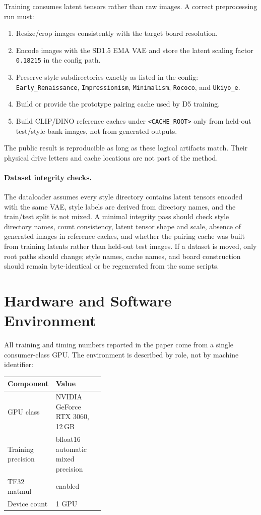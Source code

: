 \documentclass[10pt,twocolumn]{article}
\begin{document}
Training consumes latent tensors rather than raw images. A correct preprocessing run must:
\begin{enumerate}[leftmargin=1.6em,itemsep=0.2em]
  \item Resize/crop images consistently with the target board resolution.
  \item Encode images with the SD1.5 EMA VAE and store the latent scaling factor
  \texttt{0.18215} in the config path.
  \item Preserve style subdirectories exactly as listed in the config:
  \texttt{Early\_Renaissance}, \texttt{Impressionism}, \texttt{Minimalism},
  \texttt{Rococo}, and \texttt{Ukiyo\_e}.
  \item Build or provide the prototype pairing cache used by D5 training.
  \item Build CLIP/DINO reference caches under \texttt{<CACHE\_ROOT>} only from held-out
  test/style-bank images, not from generated outputs.
\end{enumerate}

The public result is reproducible as long as these logical artifacts match. Their
physical drive letters and cache locations are not part of the method.

\paragraph{Dataset integrity checks.}
The dataloader assumes every style directory contains latent tensors encoded with the
same VAE, style labels are derived from directory names, and the train/test split is not
mixed. A minimal integrity pass should check style directory names, count consistency,
latent tensor shape and scale, absence of generated images in reference caches, and
whether the pairing cache was built from training latents rather than held-out test
images. If a dataset is moved, only root paths should change; style names, cache names,
and board construction should remain byte-identical or be regenerated from the same
scripts.

\section{Hardware and Software Environment}

All training and timing numbers reported in the paper come from a single consumer-class
GPU. The environment is described by role, not by machine identifier:

\begin{center}
\begin{tabularx}{\linewidth}{p{0.38\linewidth}X}
\toprule
Component & Value \\
\midrule
GPU class & NVIDIA GeForce RTX 3060, 12\,GB \\
Training precision & bfloat16 automatic mixed precision \\
TF32 matmul & enabled \\
Device count & 1 GPU \\
\bottomrule
\end{tabularx}
\end{center}
\end{document}
